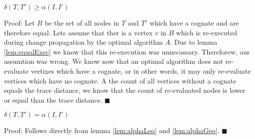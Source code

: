 \begin{lemma}
\label{lem:alphaGeq}
$\delta(T, T') \geq \alpha(I, I')$
\end{lemma} 
Proof: Let $B$ be the set of all nodes in $T$ and $T'$ which have a cognate and are therefore equal. Lets assume that ther is a vertex $v$ in $B$ which is re-executed during change propagation by the optimal algorithm $A$. Due to lemma \ref{lem:equalExec} we know that this re-execution was unnecassary. Thereforew, our assumtion was wrong. We know now that an optimal algorithm does not re-evaluate vertixes which have a cognate, or in other words, it may only re-evaluate vertices which have no cognate. A the count of all vertices without a cognate equals the trace distance, we know that the count of re-evaluated nodes is lower or equal than the trace distance. $\blacksquare$

\begin{theorem}
$\delta(T, T') = \alpha(I, I')$
\end{theorem}
Proof: Follows directly from lemma \ref{lem:alphaLeq} and \ref{lem:alphaGeq}. $\blacksquare$